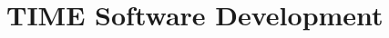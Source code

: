 \documentclass[manuscript]{aastex}
\begin{document}
\begin{figure}[!ht]%
    \centering
    \qquad
    \singlespace
    \caption[]{}%
    \label{fig:time2ab}%
\end{figure}

\begin{figure}[!ht]%
    \centering
    \qquad
    \singlespace
    \caption[]{}%
    \label{fig:time2cd}%
\end{figure}

\section{TIME Software Development}
\end{document}
